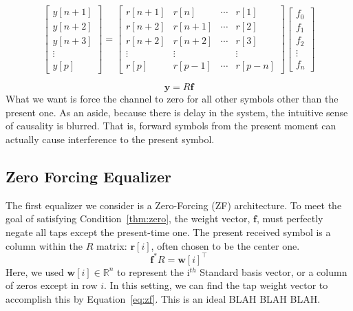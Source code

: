 \documentclass[]{article}
\begin{document}
\begin{equation}
\label{eq:equalizerVector}
\left[ \begin{array}{c}
 y \left[n+1\right] \\
 y \left[n+2\right] \\
 y \left[n+3\right] \\
\vdots  \\
y\left[ p \right] \end{array} \right] = 
\begin{bmatrix} 
r \left[ n+1\right]  & r[n] & \cdots & r\left[ 1 \right] \\ 
r \left[ n+2\right]  & r[n+1] & \cdots & r\left[ 2 \right] \\ 
r \left[ n+2\right]  & r[n+2] & \cdots & r\left[ 3 \right] \\ 
\vdots & \vdots & & \vdots \\
r \left[p \right] & r\left[ p-1 \right] & \cdots & r\left[ p-n \right]
\end{bmatrix}
 \left[ \begin{array}{c} f_0 \\ f_1 \\ f_2 \\ \vdots \\ f_n \end{array} \right]
\end{equation}

\begin{equation}
\label{eq:equalizerMatrix}
\mathbf{y} = R\mathbf{f}
\end{equation}
What we want is force the channel to zero for all other symbols other than the present one.  As an aside, because there is delay in the system, the intuitive sense of causality is blurred. That is, forward symbols from the present moment can actually cause interference to the present symbol. \\

\subsection{Zero Forcing Equalizer}
\label{sec:zf}
The first equalizer we consider is a Zero-Forcing (ZF) architecture.  To meet the goal of satisfying Condition~\ref{thm:zero}, the weight vector, $\mathbf{f}$, must perfectly negate all taps except the present-time one.  The present received symbol is a column within the $R$ matrix: $\mathbf{r}[i]$, often chosen to be the center one.  
$$ \mathbf{f}^{\ast}R = \mathbf{w}[i]^{\top} $$
Here, we used  $\mathbf{w} [i] \in \mathbb{R}^n$ to represent the i$^{th}$ Standard basis vector, or a column of zeros except in row $i$.  In this setting, we can find the tap weight vector to accomplish this by Equation~\ref{eq:zf}.  This is an ideal BLAH BLAH BLAH.\\
\end{document}
